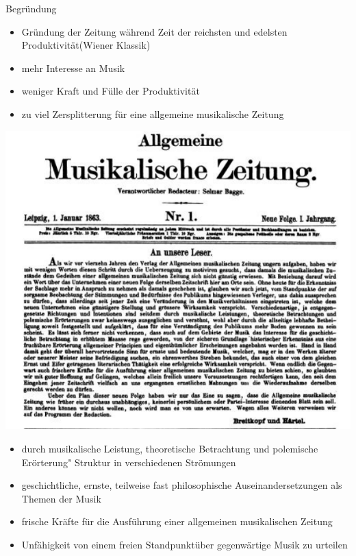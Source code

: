 \documentclass{beamer}
\begin{document}
\begin{frame}
	\begin{block}{Begründung}
	\begin{itemize}
		\item Gründung der Zeitung während \glqq Zeit der reichsten und edelsten Produktivität\grqq (Wiener Klassik)
		\item mehr Interesse an Musik
		\item weniger \glqq Kraft und Fülle der Produktivität\grqq
		\item zu viel Zersplitterung für eine \glqq allgemeine musikalische Zeitung\grqq
	\end{itemize}
	\end{block}
\end{frame}
\begin{frame}
	\includegraphics[scale=.43]{"data/hello.png"}
\end{frame}
\begin{frame}
	\begin{itemize}
		\item durch \glqq musikalische Leistung, theoretische Betrachtung und polemische Erörterung" Struktur in verschiedenen Strömungen
		\item geschichtliche, ernste, teilweise fast philosophische Auseinandersetzungen als Themen der Musik
		\item \glqq frische Kräfte für die Ausführung einer allgemeinen musikalischen Zeitung\grqq
		\item Unfähigkeit von einem \glqq freien Standpunkt\grqq über gegenwärtige Musik zu urteilen
	\end{itemize}
\end{frame}
\end{document}
